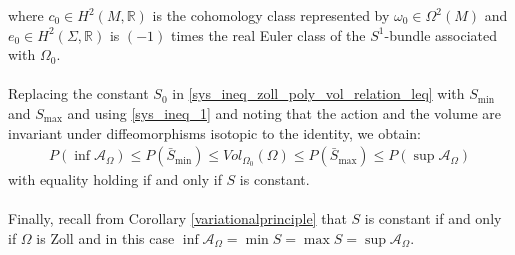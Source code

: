 \documentclass[11pt]{amsart}
\theoremstyle{plain}
\theoremstyle{definition}
\theoremstyle{remark}
\begin{document}
where $c_0 \in H^2(M, \mathbb{R})$ is the cohomology class represented by $\omega_0 \in \Omega^2(M)$ and $e_0 \in H^2(\Sigma, \mathbb{R})$ is $(-1)$ times the real Euler class of the $S^1$-bundle associated with $\Omega_0$.\\
\\
Replacing the constant $S_0$ in \eqref{sys_ineq_zoll_poly_vol_relation_leq} with $S_{\text{min}}$ and $S_{\text{max}}$ and using \eqref{sys_ineq_1} and noting that the action and the volume are invariant under diffeomorphisms isotopic to the identity, we obtain:
\begin{align}
   P(\inf \mathcal{A}_{\Omega}) \leq P(\bar{S}_{\text{min}}) \leq Vol_{\Omega_0}(\Omega) \leq P(\bar{S}_{\text{max}}) \leq P(\sup \mathcal{A}_{\Omega})
\end{align}
with equality holding if and only if $S$ is constant.\\
\\
Finally, recall from Corollary \ref{variationalprinciple} that $S$ is constant if and only if $\Omega$ is Zoll and in this case $\inf \mathcal{A}_{\Omega} = \min S = \max S = \sup \mathcal{A}_{\Omega}$.




\end{document}
